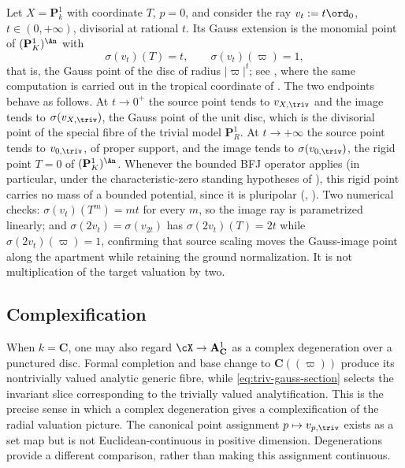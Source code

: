 \begin{example}
\label{ex:ch32-gauss-ray-numbers}
Let $X=\mathbf P^1_k$ with coordinate $T$, $p=0$, and consider the
ray $v_t:=t\ord_0$, $t\in(0,+\infty)$, divisorial at rational $t$.
Its Gauss extension
is the monomial point of $(\mathbf P^1_K)^{\An}$ with
\[
 \sigma(v_t)(T)=t,\qquad \sigma(v_t)(\varpi)=1,
\]
that is, the Gauss point of the disc of radius $|\varpi|^t$; see
, where the same computation is carried out in the
tropical coordinate of .  The two endpoints behave as
follows.  At $t\to0^+$ the source point tends to $v_{X,\triv}$ and the
image tends to $\sigma(v_{X,\triv})$, the Gauss point of the unit disc,
which is the divisorial point of the special fibre of the trivial model
$\mathbf P^1_R$.  At $t\to+\infty$ the source point tends to
$v_{0,\triv}$, of proper support, and the image tends to
$\sigma(v_{0,\triv})$, the rigid point $T=0$ of
$(\mathbf P^1_K)^{\An}$.  Whenever the bounded BFJ operator applies
(in particular, under the characteristic-zero standing hypotheses of
), this rigid point carries no mass of a bounded potential,
since it is pluripolar
(, ).  Two numerical checks:
$\sigma(v_t)(T^m)=mt$ for every $m$, so the image ray is parametrized
linearly; and $\sigma(2v_t)=\sigma(v_{2t})$ has
$\sigma(2v_t)(T)=2t$ while $\sigma(2v_t)(\varpi)=1$, confirming that source scaling moves the Gauss-image point along
the apartment while retaining the ground normalization.  It is not
multiplication of the target valuation by two.
\end{example}

\subsection{Complexification}
\label{sec:ch32-complexification}

When $k=\mathbf C$, one may also regard $\cX\to\mathbf A^1_\mathbf C$ as
a complex degeneration over a punctured disc.  Formal completion and base
change to $\mathbf C((\varpi))$ produce its nontrivially valued analytic
generic fibre, while \eqref{eq:triv-gauss-section} selects the invariant slice
corresponding to the trivially valued analytification.  This is the precise
sense in which a complex degeneration gives a complexification of the
radial valuation picture.  The canonical point assignment $p\mapsto v_{p,\triv}$ exists as a
set map but is not Euclidean-continuous in positive dimension.
Degenerations provide a different comparison, rather than making this
assignment continuous.

